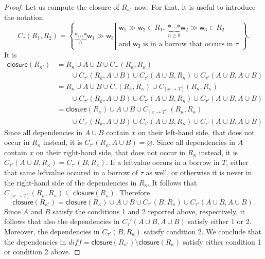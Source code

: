 \begin{proof}
  Let us compute the closure of $R_{\kappa'}$ now. For that, it is useful to introduce the notation
  \[
  C_\tau(R_1,R_2)=\left\{\underbrace{\mathtt{*}\cdots\mathtt{*}}_{n}\mathsf{w}_1\gg\mathsf{w}_3\left|
  \begin{array}{l}
    \mathsf{w}_1\gg\mathsf{w}_2\in R_1,\ \underbrace{\mathtt{*}\cdots\mathtt{*}}_{n\ge 0}\mathsf{w}_2\gg\mathsf{w}_3\in R_2\\
    \text{and $\mathsf{w_3}$ is in a borrow that occurs in $\tau$}
  \end{array}\right.\right\}.
  \]
  It is
  \begin{align*}
    \mathsf{closure}(R_{\kappa'})&=R_{\kappa}\cup A\cup B\cup C_{\tau'}(R_\kappa,R_\kappa)\\
    &\qquad\cup C_{\tau'}(R_k,A\cup B)\cup C_{\tau'}(A\cup B, R_\kappa)\cup C_{\tau'}(A\cup B,A\cup B)\\
    &=R_{\kappa}\cup A\cup B\cup C_{\tau}(R_\kappa,R_\kappa)\cup C_{[x\to T]}(R_\kappa,R_\kappa)\\
    &\qquad\cup C_{\tau'}(R_k,A\cup B)\cup C_{\tau'}(A\cup B, R_\kappa)\cup C_{\tau'}(A\cup B,A\cup B)\\
    &=\mathsf{closure}(R_\kappa)\cup A\cup B\cup C_{[x\to T]}(R_\kappa,R_\kappa)\\
    &\qquad\cup C_{\tau'}(R_k,A\cup B)\cup C_{\tau'}(A\cup B, R_\kappa)\cup C_{\tau'}(A\cup B,A\cup B)
  \end{align*}
  Since all dependencies in $A\cup B$ contain $x$ on their left-hand side, that does not
  occur in $R_\kappa$ instead, it is $C_{\tau'}(R_\kappa,A\cup B)=\varnothing$.
  Since all dependencies in $A$ contain $x$ on their right-hand side, that does not
  occur in $R_\kappa$ instead, it is $C_{\tau'}(A\cup B,R_\kappa)=C_{\tau'}(B,R_\kappa)$.
  If a leftvalue occurs in a borrow in $T$, either that same leftvalue occured in a borrow
  of $\tau$ as well, or otherwise it is never in the right-hand side of the dependencies
  in $R_\kappa$. It follows that $C_{[x\to T]}(R_\kappa,R_\kappa)\subseteq\mathsf{closure}(R_\kappa)$.
  Therefore
  \[
    \mathsf{closure}(R_{\kappa'})=\mathsf{closure}(R_\kappa)
    \cup A\cup B\cup C_{\tau'}(B, R_\kappa)\cup C_{\tau'}(A\cup B,A\cup B).
  \]
  Since $A$ and $B$ satisfy the conditions 1 and 2 reported above, respectively, it follows that
  also the dependencies in $C_\tau'(A\cup B,A\cup B)$ satisfy either 1 or 2. Moreover,
  the dependencies in $C_{\tau'}(B,R_\kappa)$ satisfy condition 2. We conclude that the
  dependencies in $\mathit{diff}=\mathsf{closure}(R_{\kappa'})\setminus\mathsf{closure}(R_\kappa)$
  satisfy either condition 1 or condition 2 above.


\end{proof}
